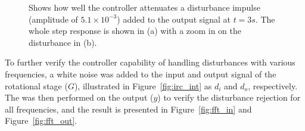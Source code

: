 \begin{figure}[h!]
  \centering %
  \qquad
  \caption{\label{fig:irc_dist_output} Shows how well the controller attenuates a disturbance impulse (amplitude of $5.1 \times 10^{-3}$) added to the output signal at $t=3s$. The whole step response is shown in (a) with a zoom in on the disturbance in (b).}
\end{figure}
\FloatBarrier
To further verify the controller capability of handling disturbances with various frequencies, a white noise was added to the input and output signal of the rotational stage ($G$), illustrated in Figure~\ref{fig:irc_int} as $d_i$ and $d_o$, respectively. The \abbrFFT was then performed on the output ($y$) to verify the disturbance rejection for all frequencies, and the result is presented in Figure~\ref{fig:fft_in} and Figure~\ref{fig:fft_out}.

